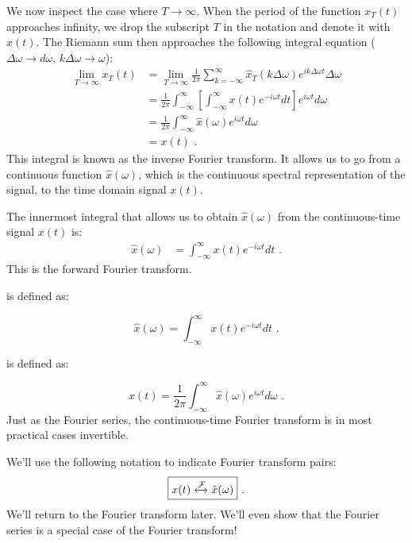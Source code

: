 We now inspect the case where $T\rightarrow \infty$. When the period of the function $x_{T}(t)$ approaches infinity, 
we drop the subscript $T$ in the notation and denote it with $x(t)$. The Riemann sum then approaches the following integral equation ($\Delta\omega \rightarrow d\omega$, $k\Delta\omega \rightarrow \omega$):
\begin{align}
\lim_{T\rightarrow \infty} x_{T}(t)  &= \lim_{T\rightarrow \infty}\frac{1}{2\pi} \sum_{k=-\infty}^{\infty} \hat{x}_{T}(k\Delta \omega) e^{ik\Delta \omega t}\Delta\omega \\
&=\frac{1}{2\pi}\int_{-\infty}^{\infty} \left[\int_{-\infty}^{\infty} x(t) e^{-i\omega t} dt\right] e^{i\omega t}d\omega\\
&= \frac{1}{2\pi} \int_{-\infty}^{\infty} \hat{x}(\omega) e^{i\omega t}d\omega\\
&= x(t) \,\,.
\end{align}
This integral is known as the inverse Fourier transform. It allows us to go from a continuous function $\hat{x}(\omega)$, 
which is the continuous spectral representation of the signal, to the time domain signal $x(t)$.

The innermost integral that allows us to obtain $\hat{x}(\omega)$ from the continuous-time signal $x(t)$ is:
\begin{align}
\hat{x}(\omega)  &= \int_{-\infty}^{\infty} x(t) e^{-i\omega t} dt \,\,.
\end{align}
This is the forward Fourier transform.

 is defined as:

\begin{equation}
\boxed{
\hat{x}(\omega) = \int_{-\infty}^{\infty} x(t) e^{-i\omega t}dt
} \,\,.
\end{equation}

 is defined as:

\begin{equation}
\boxed{
x(t) = \frac{1}{2\pi}\int_{-\infty}^{\infty} \hat{x}(\omega) e^{i\omega t}d\omega
} \,\,.
\end{equation}
Just as the Fourier series, the continuous-time Fourier transform is in most practical cases invertible.

We'll use the following notation to indicate Fourier transform pairs:
\begin{equation}
\boxed{
x(t) \xleftrightarrow{\mathcal{F}} \hat{x}(\omega)
} \,\,.
\end{equation}
We'll return to the Fourier transform later. We'll even show that the Fourier series is a special case of the Fourier transform!

